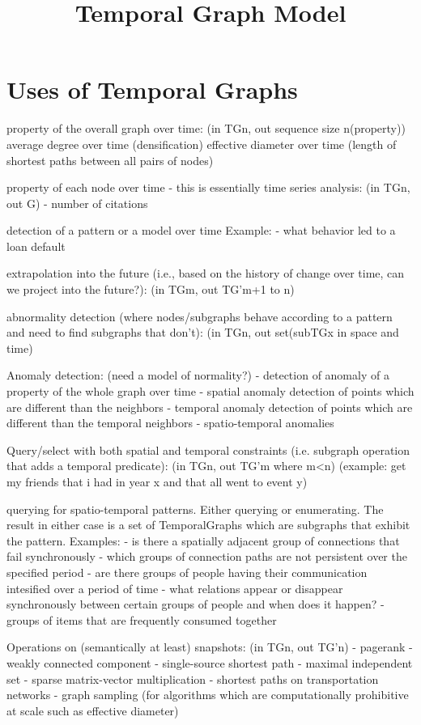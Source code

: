\documentclass[10pt]{article}
\begin{document}
\title{Temporal Graph Model}

\section{Uses of Temporal Graphs}

property of the overall graph over time: (in TGn, out sequence size
n(property)) average degree over time (densification) effective
diameter over time (length of shortest paths between all pairs of
nodes)

property of each node over time - this is essentially time series
analysis: (in TGn, out G) - number of citations

detection of a pattern or a model over time
Example:
 - what behavior led to a loan default

extrapolation into the future (i.e., based on the history of change over time, can we project into the future?): (in TGm, out TG'm+1 to n)

abnormality detection (where nodes/subgraphs behave according to a pattern and need to find subgraphs that don't): (in TGn, out set(subTGx in space and time)

Anomaly detection: (need a model of normality?)
- detection of anomaly of a property of the whole graph over time
- spatial anomaly detection of points which are different than the neighbors
- temporal anomaly detection of points which are different than the temporal neighbors
- spatio-temporal anomalies

Query/select with both spatial and temporal constraints (i.e. subgraph operation that adds a temporal predicate): (in TGn, out TG'm where m<n)
 (example: get my friends that i had in year x and that all went to event y)


querying for spatio-temporal patterns. Either querying or enumerating. The result in either case is a set of TemporalGraphs which are subgraphs that exhibit the pattern.
Examples:
 - is there a spatially adjacent group of connections that fail synchronously
 - which groups of connection paths are not persistent over the specified period
 - are there groups of people having their communication intesified over a period of time
 - what relations appear or disappear synchronously between certain groups of people and when does it happen?
 - groups of items that are frequently consumed together

Operations on (semantically at least) snapshots: (in TGn, out TG'n)
 - pagerank
 - weakly connected component
 - single-source shortest path
 - maximal independent set
 - sparse matrix-vector multiplication
 - shortest paths on transportation networks
 - graph sampling (for algorithms which are computationally prohibitive at scale such as effective diameter)
\end{document}
